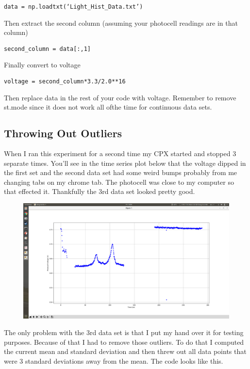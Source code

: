 \begin{verbatim}
data = np.loadtxt(‘Light_Hist_Data.txt’)
\end{verbatim}
Then extract the second column (assuming your photocell readings are in that column)
\begin{verbatim}
second_column = data[:,1]
\end{verbatim}
Finally convert to voltage
\begin{verbatim}
voltage = second_column*3.3/2.0**16
\end{verbatim}
Then replace data in the rest of your code with voltage. Remember to remove st.mode since it does not work all ofthe time for continuous data sets. 
\subsection{Throwing Out Outliers}
When I ran this experiment for a second time my CPX started and stopped 3 separate times. You'll see in the time series plot below that the voltage dipped in the first set and the second data set had some weird bumps probably from me changing tabs on my chrome tab. The photocell was close to my computer so that effected it. Thankfully the 3rd data set looked pretty good.
\begin{figure}[H]
  \begin{center}
    \includegraphics[width=\textwidth]{Figures/photocell_bad.png}
  \end{center}
\end{figure}
The only problem with the 3rd data set is that I put my hand over it for testing purposes. Because of that I had to remove those outliers. To do that I computed the current mean and standard deviation and then threw out all data points that were 3 standard deviations away from the mean. The code looks like this.
